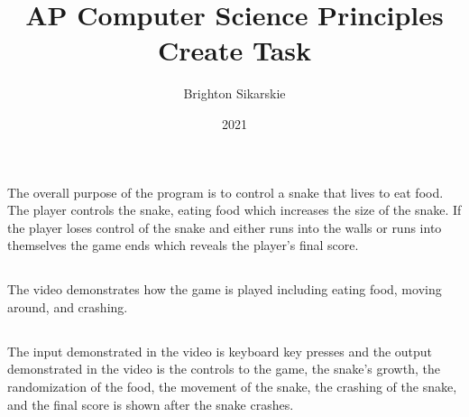 \documentclass{article}
\title{AP Computer Science Principles Create Task}
\author{Brighton Sikarskie}
\date{2021}
\begin{document}
\maketitle

\renewcommand{\thesection}{3 \alph{section}}
\renewcommand{\thesubsection}{\roman{subsection}}

\section{}
\subsection{}
The overall purpose of the program is to control a snake that lives to eat food. The player controls the snake, eating food which increases the size of the snake. If the player loses control of the snake and either runs into the walls or runs into themselves the game ends which reveals the player’s final score.
\subsection{}
The video demonstrates how the game is played including eating food, moving around, and crashing.
\subsection{}
The input demonstrated in the video is keyboard key presses and the output demonstrated in the video is the controls to the game, the snake’s growth, the randomization of the food, the movement of the snake, the crashing of the snake, and the final score is shown after the snake crashes.

\section{}
\end{document}
